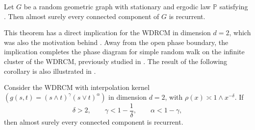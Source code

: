 \documentclass[11pt,a4paper]{scrartcl}
\newcommand{\vertex}{\node[vertex]}
\renewcommand{\P}{\mathbb{P}}
\newcommand{\Z}{\mathbb{Z}}
\newcommand{\R}{\mathbb{R}}
\newcommand{\1}{\mathbb{1}}
\newcommand{\x}{\mathbf{x}}
\newcommand{\y}{\mathbf{y}}
\begin{document}
\begin{theorem}
\label{thm:planar-rec-d2}
Let \(G\) be a random geometric graph with stationary and ergodic law $\P$ satisfying . Then almost surely every connected component of \(G\) is recurrent.
\end{theorem}

This theorem has a direct implication for the WDRCM in dimension $d=2$, which was also the motivation behind . Away from the open phase boundary, the implication completes the phase diagram for simple random walk on the infinite cluster of the WDRCM, previously studied in \cite{GHMM2022,Baeumler2023_recurrence,Moench2024}. The result of the following corollary is also illustrated in .

\begin{corollary}
\label{cor:wdrcm-interpolation-d2}
Consider the WDRCM with interpolation kernel $\left( g(s,t)=(s\wedge t)^\gamma (s\vee t)^\alpha \right)$ in
dimension \(d=2\), with 
\(\rho(x)\asymp 1\wedge x^{-\delta}\).  If
\[
  \delta>2,\qquad
  \gamma<1-\frac1\delta,\qquad
  \alpha<1-\gamma,
\]
then %
almost surely every connected
component is recurrent.
\end{corollary}


\end{document}
